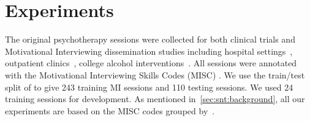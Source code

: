 \section{Experiments}
\label{sec:snt:experiments}

The original psychotherapy sessions were collected for both clinical
trials and Motivational Interviewing dissemination studies including
hospital settings~\citep{roy2014brief}, outpatient
clinics~\citep{baer2009agency}, college alcohol
interventions~\citep{tollison2008questions, neighbors2012randomized,
  lee2013indicated, lee2014randomized}.  All sessions were annotated
with the Motivational Interviewing Skills Codes (MISC)
\citep{atkins2014scaling}.  We use the train/test split of
\citet{can2015dialog, tanana2016comparison} to give 243 training MI
sessions and 110 testing sessions. We used 24 training sessions for
development.
As mentioned in~\autoref{sec:snt:background}, all our experiments are
based on the MISC codes grouped by~\citet{xiao2016behavioral}.





